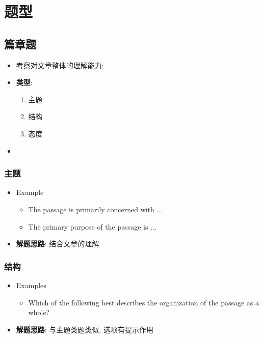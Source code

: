 \chapter{题型}

\section{篇章题}

  \begin{itemize}
    \item 考察对文章整体的理解能力;
    \item \textbf{类型}:
    \begin{enumerate}
      \item 主题
      \item 结构
      \item 态度
    \end{enumerate}

    \item {}
  \end{itemize}

  \subsection{主题}

    \begin{itemize}
      \item Example
      \begin{itemize}
        \item The passage is primarily concerned with ...
        \item The primary purpose of the passage is ...
      \end{itemize}

      \item \textbf{解题思路}: 结合文章的理解
    \end{itemize}

  \subsection{结构}

    \begin{itemize}
      \item Examples
      \begin{itemize}
        \item Which of the following best describes the organization of the
        passage as a whole?
      \end{itemize}

      \item \textbf{解题思路}: 与主题类题类似, 选项有提示作用
    \end{itemize}

